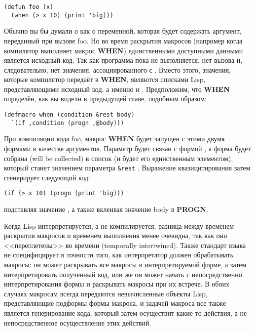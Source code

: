 \begin{lstlisting}
(defun foo (x)
  (when (> x 10) (print 'big)))
\end{lstlisting}

Обычно вы бы думали о  как о переменной, которая будет содержать аргумент,
переданный при вызове foo. Но во время раскрытия макросов (например когда компилятор
выполняет макрос \textbf{WHEN}) единственными доступными данными является исходный
код. Так как программа пока не выполняется, нет вызова  и, следовательно, нет
значения, ассоциированного с . Вместо этого, значения, которые компилятор передаёт
в \textbf{WHEN}, являются списками Lisp, представляющими исходный код, а именно  и . Предположим, что \textbf{WHEN} определён, как вы видели в
предыдущей главе, подобным образом:

\begin{lstlisting}
(defmacro when (condition &rest body)
  `(if ,condition (progn ,@body)))
\end{lstlisting}

При компиляции кода foo, макрос \textbf{WHEN} будет запущен с этими двумя формами в
качестве аргументов. Параметр  будет связан с формой , а
форма  будет собрана (will be collected) в список (и будет его
единственным элементом), который станет значением параметра \lstinline!&rest!
. Выражение квазицитирования затем сгенерирует следующий код:

\begin{lstlisting}
(if (> x 10) (progn (print 'big)))
\end{lstlisting}

подставляя значение , а также вклеивая значение body в \textbf{PROGN}.

Когда Lisp интерпретируется, а не компилируется, разница между временем раскрытия макросов
и временем выполнения менее очевидна, так как они <<переплетены>> во времени (temporally
intertwined). Также стандарт языка не специфицирует в точности того, как интерпретатор должен
обрабатывать макросы: он может раскрывать все макросы в интерпретируемой форме, а затем
интерпретировать полученный код, или же он может начать с непосредственно интерпретирования
формы и раскрывать макросы при их встрече. В обоих случаях макросам всегда передаются
невычисленные объекты Lisp, представляющие подформы формы макроса, и задачей макроса все
также является генерирование кода, который затем осуществит какие-то действия, а не
непосредственное осуществление этих действий.

